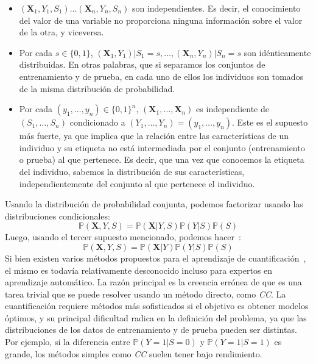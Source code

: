 \begin{itemize}
  \item $(\boldsymbol{X}_1,Y_1,S_1) \dots (\boldsymbol{X}_n,Y_n,S_n)$ son
  independientes. Es decir, el conocimiento del valor de una variable no
  proporciona ninguna información sobre el valor de la otra, y viceversa.
  \item Por cada $s \in \{0,1\}$,
  $(\boldsymbol{X}_1,Y_1)|S_1=s,\dots,(\boldsymbol{X}_n,Y_n)|S_n=s$ son
  idénticamente distribuidas. En otras palabras, que si separamos los conjuntos
  de entrenamiento y de prueba, en cada uno de ellos los individuos son tomados
  de la misma distribución de probabilidad.
  \item Por cada $(y_1,\dots,y_n)\in{\{0,1\}}^n$,
  $(\boldsymbol{X}_1,\dots,\boldsymbol{X}_n)$ es independiente de
  $(S_1,\dots,S_n)$ condicionado a $(Y_1,\dots,Y_n)=(y_1,\dots,y_n)$. Este es el
  supuesto más fuerte, ya que implica que la relación entre las características
  de un individuo y su etiqueta no está intermediada por el conjunto
  (entrenamiento o prueba) al que pertenece. Es decir, que una vez que conocemos
  la etiqueta del individuo, sabemos la distribución de sus características,
  independientemente del conjunto al que pertenece el individuo.
\end{itemize}

Usando la distribución de probabilidad conjunta, podemos factorizar usando las
distribuciones condicionales:
\begin{equation}
    \mathbb{P}(\boldsymbol{X},Y,S)=\mathbb{P}(\boldsymbol{X}|Y,S)\mathbb{P}(Y|S)\mathbb{P}(S)
\end{equation}
Luego, usando el tercer supuesto mencionado, podemos
hacer~\cite{moreno2012unifying}:
\begin{equation}
    \mathbb{P}(\boldsymbol{X},Y,S)=\mathbb{P}(\boldsymbol{X}|Y)\mathbb{P}(Y|S)\mathbb{P}(S)
\end{equation}
Si bien existen varios métodos propuestos para el aprendizaje de
cuantificación~\cite{esuli2023learning, gonzalez2017review}, el mismo es todavía
relativamente desconocido incluso para expertos en aprendizaje automático. La
razón principal es la creencia errónea de que es una tarea trivial que se puede
resolver usando un método directo, como {\it CC}. La cuantificación requiere
métodos más sofisticados si el objetivo es obtener modelos óptimos, y su
principal dificultad radica en la definición del problema, ya que las
distribuciones de los datos de entrenamiento y de prueba pueden ser distintas.
Por ejemplo, si la diferencia entre $\mathbb{P}(Y=1|S=0)$ y
$\mathbb{P}(Y=1|S=1)$ es grande, los métodos simples como {\it CC\/} suelen
tener bajo rendimiento.


